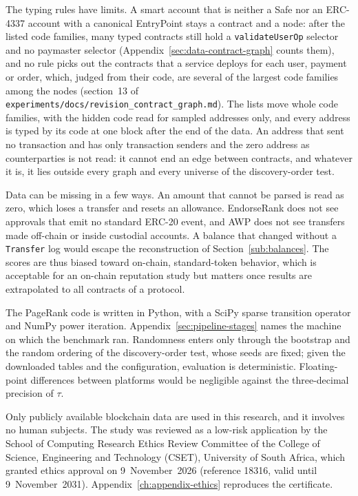 The typing rules have limits. A smart account that is neither a Safe nor an ERC-4337 account with a canonical EntryPoint stays a contract and a node: after the listed code families, many typed contracts still hold a \texttt{validateUserOp} selector and no paymaster selector (Appendix~\ref{sec:data-contract-graph} counts them), and no rule picks out the contracts that a service deploys for each user, payment or order, which, judged from their code, are several of the largest code families among the nodes (section~13 of \texttt{experiments/docs/revision\_contract\_graph.md}). The lists move whole code families, with the hidden code read for sampled addresses only, and every address is typed by its code at one block after the end of the data. An address that sent no transaction and has only transaction senders and the zero address as counterparties is not read: it cannot end an edge between contracts, and whatever it is, it lies outside every graph and every universe of the discovery-order test.

Data can be missing in a few ways. An amount that cannot be parsed is read as zero, which loses a transfer and resets an allowance. EndorseRank does not see approvals that emit no standard ERC-20 event, and AWP does not see transfers made off-chain or inside custodial accounts. A balance that changed without a \texttt{Transfer} log would escape the reconstruction of Section~\ref{sub:balances}. The scores are thus biased toward on-chain, standard-token behavior, which is acceptable for an on-chain reputation study but matters once results are extrapolated to all contracts of a protocol.


The PageRank code is written in Python, with a SciPy sparse transition operator and NumPy power iteration. Appendix~\ref{sec:pipeline-stages} names the machine on which the benchmark ran. Randomness enters only through the bootstrap and the random ordering of the discovery-order test, whose seeds are fixed; given the downloaded tables and the configuration, evaluation is deterministic. Floating-point differences between platforms would be negligible against the three-decimal precision of $\tau$.


Only publicly available blockchain data are used in this research, and it involves no human subjects. The study was reviewed as a low-risk application by the School of Computing Research Ethics Review Committee of the College of Science, Engineering and Technology (CSET), University of South Africa, which granted ethics approval on 9~November~2026 (reference 18316, valid until 9~November~2031). Appendix~\ref{ch:appendix-ethics} reproduces the certificate.

